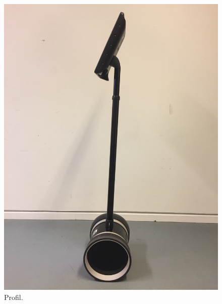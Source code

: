 \begin{figure}[H]
\begin{minipage}{.33\textwidth}
  \includegraphics[width=\linewidth, angle =-90]{Figure/TestdesignParametre/ModificeretDoubleSide}
  \caption{Profil.}
  \label{fig:ModificeretDoubleSide}
\end{minipage}
\begin{minipage}{.33\textwidth}
  \centering

\end{minipage}
\end{figure}

